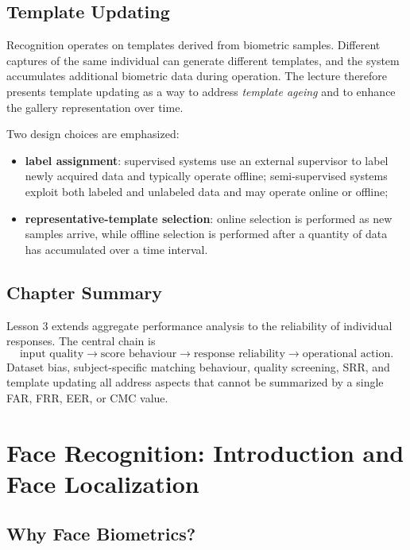 \documentclass[11pt,a4paper,oneside]{report}
\begin{document}
\section{Template Updating}
\label{sec:template-updating}

Recognition operates on templates derived from biometric samples.  Different
captures of the same individual can generate different templates, and the
system accumulates additional biometric data during operation.  The lecture
therefore presents template updating as a way to address \emph{template ageing}
and to enhance the gallery representation over time.

Two design choices are emphasized:
\begin{itemize}
    \item \textbf{label assignment}: supervised systems use an external
          supervisor to label newly acquired data and typically operate offline;
          semi-supervised systems exploit both labeled and unlabeled data and
          may operate online or offline;
    \item \textbf{representative-template selection}: online selection is
          performed as new samples arrive, while offline selection is performed
          after a quantity of data has accumulated over a time interval.
\end{itemize}

\section{Chapter Summary}

Lesson 3 extends aggregate performance analysis to the reliability of
individual responses.  The central chain is
\[
\text{input quality}
\longrightarrow
\text{score behaviour}
\longrightarrow
\text{response reliability}
\longrightarrow
\text{operational action}.
\]
Dataset bias, subject-specific matching behaviour, quality screening, SRR, and
template updating all address aspects that cannot be summarized by a single FAR,
FRR, EER, or CMC value.

\chapter{Face Recognition: Introduction and Face Localization}
\label{chap:face-intro-localization}

\section{Why Face Biometrics?}
\label{sec:why-face}
\end{document}
